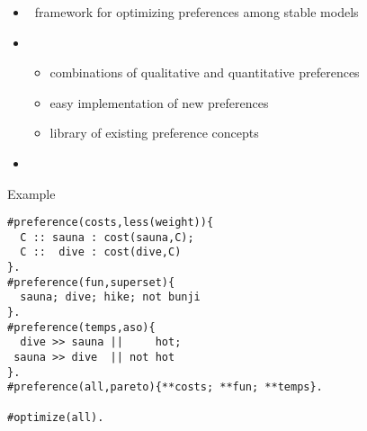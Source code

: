 \newcommand{\pf}[0]{\ensuremath{\mathit{preference}}} %
\newcommand{\name}[0]{\ensuremath{\mathit{name}}} %
\begin{frame}{\asprin}
  \begin{itemize}
  \item {} \ framework for optimizing preferences among stable models
  \item {} \
    \begin{itemize}
    \item combinations of qualitative and quantitative preferences
    \item easy implementation of new preferences
    \item library of existing preference concepts
  \end{itemize}
\item {} \ \cite{brderosc15a,alrosc18a,brderosc22a}
  \end{itemize}
\end{frame}
\begin{frame}[fragile]{Example}
\begin{lstlisting}[language=clingo,basicstyle=\small\ttfamily]
#preference(costs,less(weight)){
  C :: sauna : cost(sauna,C);
  C ::  dive : cost(dive,C)
}.
#preference(fun,superset){
  sauna; dive; hike; not bunji
}.
#preference(temps,aso){
  dive >> sauna ||     hot;
 sauna >> dive  || not hot
}.
#preference(all,pareto){**costs; **fun; **temps}.

#optimize(all).
\end{lstlisting}
\end{frame}
